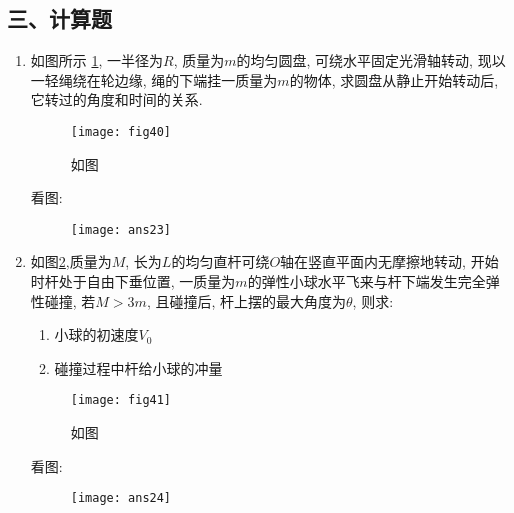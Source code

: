 \subsection*{三、计算题}
\begin{enumerate}
    \item 如图所示 \ref{Fig:40}, 一半径为$R$, 质量为$m$的均匀圆盘, 可绕水平固定光滑轴转动, 
    现以一轻绳绕在轮边缘, 绳的下端挂一质量为$m$的物体, 
    求圆盘从静止开始转动后, 它转过的角度和时间的关系.
    \begin{figure}[H]
        \centering
        \texttt{[image: fig40]}
            \caption{如图}\label{Fig:40}
    \end{figure}
    \begin{solution}
        看图: 
        \begin{figure}[H]
            \centering
            \texttt{[image: ans23]}
        \end{figure}
    \end{solution}
    \item 如图\ref{Fig:41},质量为$M$, 长为$L$的均匀直杆可绕$O$轴在竖直平面内无摩擦地转动, 开始时杆处于自由下垂位置, 
    一质量为$m$的弹性小球水平飞来与杆下端发生完全弹性碰撞, 若$M>3m$, 且碰撞后, 杆上摆的最大角度为$\theta$, 则求:
    \begin{enumerate}
        \item[(1)] 小球的初速度$V_0$
        \item[(2)] 碰撞过程中杆给小球的冲量
    \end{enumerate}
        \begin{figure}[H]
            \centering
            \texttt{[image: fig41]}
                \caption{如图}\label{Fig:41}
        \end{figure}
        \begin{solution}
            看图: 
            \begin{figure}[H]
                \centering
                \texttt{[image: ans24]}
            \end{figure}
        \end{solution}  
\end{enumerate}